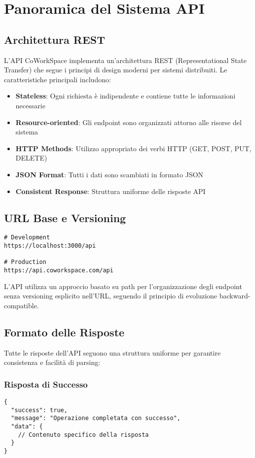 \section{Panoramica del Sistema API}

\subsection{Architettura REST}
L'API CoWorkSpace implementa un'architettura REST (Representational State Transfer) che segue i principi di design moderni per sistemi distribuiti. Le caratteristiche principali includono:

\begin{itemize}
    \item \textbf{Stateless}: Ogni richiesta è indipendente e contiene tutte le informazioni necessarie
    \item \textbf{Resource-oriented}: Gli endpoint sono organizzati attorno alle risorse del sistema
    \item \textbf{HTTP Methods}: Utilizzo appropriato dei verbi HTTP (GET, POST, PUT, DELETE)
    \item \textbf{JSON Format}: Tutti i dati sono scambiati in formato JSON
    \item \textbf{Consistent Response}: Struttura uniforme delle risposte API
\end{itemize}

\subsection{URL Base e Versioning}
\begin{lstlisting}[style=httpstyle, caption=URL Base dell'API]
# Development
https://localhost:3000/api

# Production
https://api.coworkspace.com/api
\end{lstlisting}

L'API utilizza un approccio basato su path per l'organizzazione degli endpoint senza versioning esplicito nell'URL, seguendo il principio di evoluzione backward-compatible.

\subsection{Formato delle Risposte}
Tutte le risposte dell'API seguono una struttura uniforme per garantire consistenza e facilità di parsing:

\subsubsection{Risposta di Successo}
\begin{lstlisting}[caption=Struttura Risposta di Successo]
{
  "success": true,
  "message": "Operazione completata con successo",
  "data": {
    // Contenuto specifico della risposta
  }
}
\end{lstlisting}

